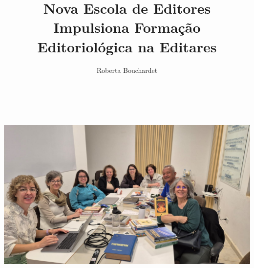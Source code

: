 \documentclass{gescons}
\author{Roberta Bouchardet}
\title{Nova Escola de Editores Impulsiona Formação Editoriológica na Editares}
\begin{document}
    \makeentrevistatitle


    
    
\begin{center}
    \includegraphics[height=10cm]{articles/atualizacoes/fotos/escola-editores/escola-editores4.jpeg} 
\end{center}
    
\end{document}
